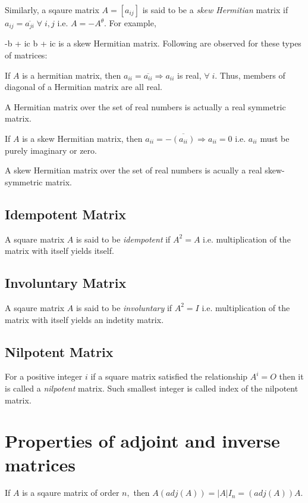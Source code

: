 Similarly, a sqaure matrix $A = [a_{ij}]$ is said to be a {\it skew Hermitian} matrix if $a_{ij} = \overline{a_{ji}}\;\forall\;i,
j$ i.e. $A = -A^{\theta}$. For example,

\startformula \startbmatrix{} \NC -b + ic \NR\NC b + ic \NR\stopbmatrix \stopformula is a skew Hermitian matrix. Following are observed for these types of
matrices:
\startitemize[n]
\item If $A$ is a hermitian matrix, then $a_{ii} = \overline{a_{ii}} \Rightarrow a_{ii}$ is real, $\forall\;i.$ Thus, members of
  diagonal of a Hermitian matrix are all real.
\item A Hermitian matrix over the set of real numbers is actually a real symmetric matrix.
\item If $A$ is a skew Hermitian matrix, then $a_{ii} = -\overline{(a_{ii})} \Rightarrow a_{ii} = 0$ i.e. $a_{ii}$ must be purely
  imaginary or zero.
\item A skew Hermitian matrix over the set of real numbers is acually a real skew-symmetric matrix.
\stopitemize

\subsection{Idempotent Matrix}
A square matrix $A$ is said to be {\it idempotent} if $A^2 = A$ i.e. multiplication of the matrix with itself yields itself.

\subsection{Involuntary Matrix}
A sqaure matrix $A$ is said to be {\it involuntary} if $A^2 = I$ i.e. multiplication of the matrix with itself yields an
indetity matrix.

\subsection{Nilpotent Matrix}
For a positive integer $i$ if a square matrix satisfied the relationship $A^i = O$ then it is called a {\it nilpotent}
matrix. Such smallest integer is called index of the nilpotent matrix.

\section{Properties of adjoint and inverse matrices}
\startitemize[n]
\item If $A$ is a sqaure matrix of order $n,$ then $A(adj(A)) = |A|I_n = (adj(A))A$.

